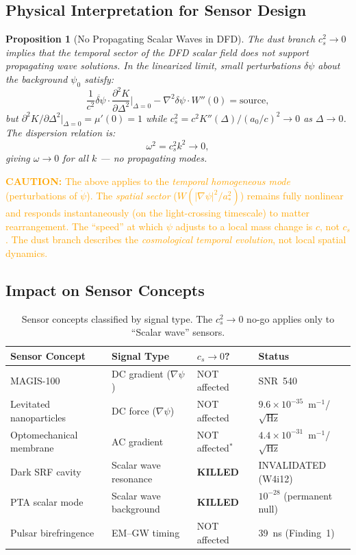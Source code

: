\documentclass[11pt]{article}
\newtheorem{proposition}[theorem]{Proposition}
\theoremstyle{definition}
\theoremstyle{remark}
\newcommand{\ee}[1]{\times10^{#1}}
\newcommand{\astar}{a_*}
\newcommand{\caution}[1]{\textcolor{orange}{\textbf{CAUTION:} #1}}
\begin{document}
\subsection{Physical Interpretation for Sensor Design}

\begin{proposition}[No Propagating Scalar Waves in DFD]
\label{prop:no-scalar-waves}
The dust branch $c_s^2 \to 0$ implies that the temporal sector of
the DFD scalar field does not support propagating wave solutions.
In the linearized limit, small perturbations $\delta\psi$ about the
background $\psi_0$ satisfy:
\begin{equation}
\frac{1}{c^2}\ddot{\delta\psi} \cdot
\frac{\partial^2 K}{\partial \Delta^2}\bigg|_{\Delta=0}
- \nabla^2 \delta\psi \cdot W''(0) = \text{source},
\end{equation}
but $\partial^2 K / \partial\Delta^2|_{\Delta=0} = \mu'(0) = 1$
while $c_s^2 = c^2 K''(\Delta)/(a_0/c)^2 \to 0$ as $\Delta \to 0$.
The dispersion relation is:
\begin{equation}
\omega^2 = c_s^2 k^2 \to 0,
\end{equation}
giving $\omega \to 0$ for all $k$ --- no propagating modes.
\end{proposition}

\caution{The above applies to the \emph{temporal homogeneous mode}
(perturbations of $\dot\psi$). The \emph{spatial sector}
($W(|\nabla\psi|^2/\astar^2)$) remains fully nonlinear and responds
instantaneously (on the light-crossing timescale) to matter
rearrangement. The ``speed'' at which $\psi$ adjusts to a local mass
change is $c$, not $c_s$. The dust branch describes the
\emph{cosmological temporal evolution}, not local spatial dynamics.}

\subsection{Impact on Sensor Concepts}

\begin{table}[H]
\centering
\small
\caption{Sensor concepts classified by signal type. The $c_s^2 \to 0$
no-go applies only to ``Scalar wave'' sensors.}
\label{tab:sensor-nogo}
\begin{tabular}{@{}llll@{}}
\toprule
Sensor Concept & Signal Type & $c_s \to 0$? & Status \\
\midrule
MAGIS-100 & DC gradient ($\nabla\psi$) & NOT affected & SNR~540 \\
Levitated nanoparticles & DC force ($\nabla\psi$) & NOT affected & $9.6\ee{-35}$~m$^{-1}$/$\sqrt{\mathrm{Hz}}$ \\
Optomechanical membrane & AC gradient & NOT affected$^*$ & $4.4\ee{-31}$~m$^{-1}$/$\sqrt{\mathrm{Hz}}$ \\
Dark SRF cavity & Scalar wave resonance & \textbf{KILLED} & INVALIDATED (W4i12) \\
PTA scalar mode & Scalar wave background & \textbf{KILLED} & $10^{-28}$ (permanent null) \\
Pulsar birefringence & EM--GW timing & NOT affected & 39~ns (Finding~1) \\
\bottomrule
\end{tabular}
\end{table}
\end{document}
